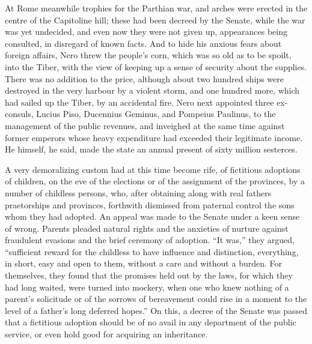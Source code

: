 
At Rome meanwhile trophies for the Parthian war, and arches were erected in the centre of the Capitoline hill; these had been decreed by the Senate, while the war was yet undecided, and even now they were not given up, appearances being consulted, in disregard of known facts. And to hide his anxious fears about foreign affairs, Nero threw the people's corn, which was so old as to be spoilt, into the Tiber, with the view of keeping up a sense of security about the supplies. There was no addition to the price, although about two hundred ships were destroyed in the very harbour by a violent storm, and one hundred more, which had sailed up the Tiber, by an accidental fire. Nero next appointed three ex-consuls, Lucius Piso, Ducennius Geminus, and Pompeius Paulinus, to the management of the public revenues, and inveighed at the same time against former emperors whose heavy expenditure had exceeded their legitimate income. He himself, he said, made the state an annual present of sixty million sesterces.


A very demoralizing custom had at this time become rife, of fictitious adoptions of children, on the eve of the elections or of the assignment of the provinces, by a number of childless persons, who, after obtaining along with real fathers praetorships and provinces, forthwith dismissed from paternal control the sons whom they had adopted. An appeal was made to the Senate under a keen sense of wrong. Parents pleaded natural rights and the anxieties of nurture against fraudulent evasions and the brief ceremony of adoption. ``It was,'' they argued, ``sufficient reward for the childless to have influence and distinction, everything, in short, easy and open to them, without a care and without a burden. For themselves, they found that the promises held out by the laws, for which they had long waited, were turned into mockery, when one who knew nothing of a parent's solicitude or of the sorrows of bereavement could rise in a moment to the level of a father's long deferred hopes.'' On this, a decree of the Senate was passed that a fictitious adoption should be of no avail in any department of the public service, or even hold good for acquiring an inheritance.


